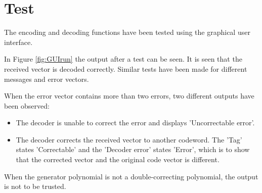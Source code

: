 \documentclass[MiniProjectMain]{subfiles}
\begin{document}
\chapter{Test}
The encoding and decoding functions have been tested using the graphical user interface. 

In Figure \ref{fig:GUIrun} the output after a test can be seen. 
It is seen that the received vector is decoded correctly. 
Similar tests have been made for different messages and error vectors. 

When the error vector contains more than two errors, two different outputs have been observed:
\begin{itemize}
\item The decoder is unable to correct the error and displays 'Uncorrectable error'.

\item The decoder corrects the received vector to another codeword. The 'Tag' states 'Correctable' and the 'Decoder error' states 'Error', which is to show that the corrected vector and the original code vector is different.
\end{itemize}

When the generator polynomial is not a double-correcting polynomial, the output is not to be trusted.
\end{document}
